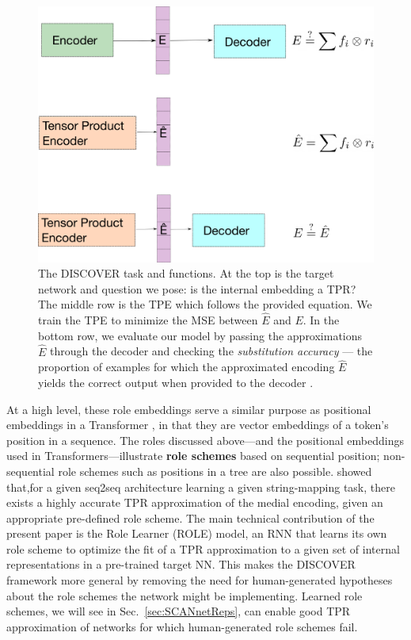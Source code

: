 \begin{figure}[t]
    \centering
    \includegraphics[scale=.25]{images/rldn/task.png}
    \caption{The DISCOVER task and functions. At the top is the target network and question we pose: is the internal embedding a TPR? The middle row is the TPE which follows the provided equation. We train the TPE to minimize the MSE between $\hat{E}$ and $E$. In the bottom row, we evaluate our model by passing the approximations $\hat{E}$ through the decoder and checking the \textit{substitution accuracy} --- the proportion of examples for which the approximated encoding $\hat{E}$ yields the correct output when provided to the decoder .}
    \label{fig:discover}
\end{figure}

At a high level, these role embeddings serve a similar purpose as positional embeddings in a Transformer \citep{vaswani2017attention}, in that they are vector embeddings of a token's position in a sequence. The roles discussed above---and the positional embeddings used in Transformers---illustrate \textbf{role schemes} based on sequential position; non-sequential role schemes such as positions in a tree are also possible. \citet{mccoy} showed that,for a given seq2seq architecture learning a given string-mapping task, there exists a highly accurate TPR approximation of the medial encoding, given an appropriate  pre-defined role scheme. The main technical contribution of the present paper is the Role Learner (ROLE) model, an RNN that learns its own role scheme to optimize the fit of a TPR approximation to a given set of internal representations in a pre-trained target NN. This makes the DISCOVER framework more general by removing the need for human-generated hypotheses about the role schemes the network might be implementing. Learned role schemes, we will see in Sec.~\ref{sec:SCANnetReps}, can enable good TPR approximation of networks for which human-generated role schemes fail.

